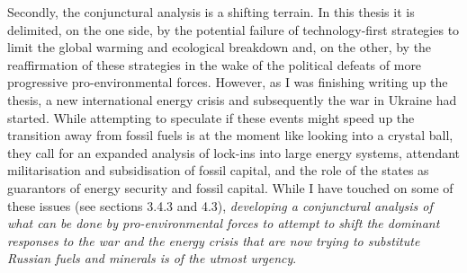\documentclass[a4paper, nobind]{templates/ociamthesis}
\begin{document}
Secondly, the conjunctural analysis is a shifting terrain. In this thesis it is delimited, on the one side, by the potential failure of technology-first strategies to limit the global warming and ecological breakdown and, on the other, by the reaffirmation of these strategies in the wake of the political defeats of more progressive pro-environmental forces. However, as I was finishing writing up the thesis, a new international energy crisis and subsequently the war in Ukraine had started. While attempting to speculate if these events might speed up the transition away from fossil fuels is at the moment like looking into a crystal ball, they call for an expanded analysis of lock-ins into large energy systems, attendant militarisation and subsidisation of fossil capital, and the role of the states as guarantors of energy security and fossil capital. While I have touched on some of these issues (see sections 3.4.3 and 4.3), \emph{developing a conjunctural analysis of what can be done by pro-environmental forces to attempt to shift the dominant responses to the war and the energy crisis that are now trying to substitute Russian fuels and minerals is of the utmost urgency}.
\end{document}
